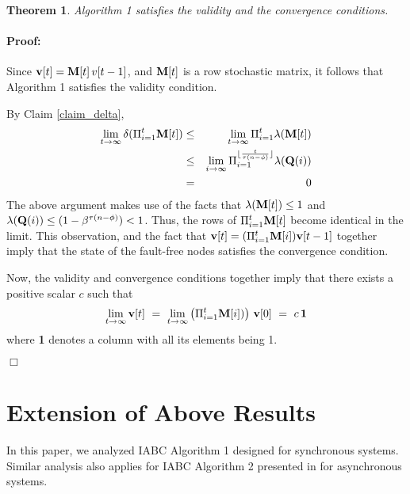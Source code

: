 \documentclass[letterpaper, 12pt]{article}
\newenvironment{proof}{\paragraph{\bf Proof:}}{\hspace*{\fill}\(\Box\)}
\newtheorem{theorem}{Theorem}
\begin{document}
\begin{theorem}
\label{t}
Algorithm 1 satisfies the validity and the convergence conditions.
\end{theorem}
\begin{proof}

Since ${\bf v}[t]={\bf M}[t]\,v[t-1]$, and ${\bf M}[t]$ is a row stochastic matrix, it
follows that
Algorithm 1 satisfies the validity condition.

By Claim \ref{claim_delta}, 
\begin{eqnarray}
\lim_{t\rightarrow \infty} \delta(\Pi_{i=1}^t {\bf M}[t])
& \leq & \lim_{t\rightarrow\infty} \Pi_{i=1}^t \lambda({\bf M}[t]) \\ 
& \leq & \lim_{i\rightarrow\infty} \Pi_{i=1}^{\lfloor\frac{t}{\tau(n-\phi)}\rfloor} \lambda({\bf Q}(i)) \\
& = & 0 
\end{eqnarray}
The above argument makes use of the facts that
$\lambda({\bf M}[t])\leq 1$ and $\lambda({\bf Q}(i))\leq (1-\beta^{\tau(n-\phi)})<1$.
Thus, the rows of $\Pi_{i=1}^t {\bf M}[t]$ become identical in the limit.
This observation, and the fact that ${\bf v}[t]=(\Pi_{i=1}^t {\bf M}[i]){\bf v}[t-1]$ together imply that
the state of the fault-free nodes satisfies the
convergence condition.


Now, the validity and convergence conditions
together imply that 
there exists a positive scalar $c$ such that
\[
\lim_{t\rightarrow\infty}
{\bf v}[t] ~ = ~ \lim_{t\rightarrow\infty} \left( \Pi_{i=1}^t {\bf M}[i]) \right)\,
{\bf v}[0] ~ = ~ c\,{\bf 1}
\] 
where {\bf 1} denotes a column with all its elements being 1.

\end{proof}

\section{Extension of Above Results}
\label{s_extend}

In this paper, we
analyzed IABC Algorithm 1 designed for synchronous systems. Similar
analysis also applies for IABC Algorithm 2 presented
in \cite{us} for asynchronous systems. 
\end{document}

